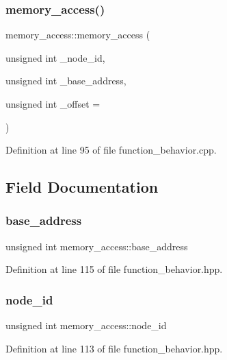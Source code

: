 \subsubsection{\texorpdfstring{memory\+\_\+access()}{memory\_access()}}
{\footnotesize\ttfamily memory\+\_\+access\+::memory\+\_\+access (\begin{DoxyParamCaption}\item[{unsigned int}]{\+\_\+node\+\_\+id,  }\item[{unsigned int}]{\+\_\+base\+\_\+address,  }\item[{unsigned int}]{\+\_\+offset = {} }\end{DoxyParamCaption})}



Definition at line 95 of file function\+\_\+behavior.\+cpp.



\subsection{Field Documentation}
\mbox{\label{structmemory__access_aea0ee31948f3811cfb5e6f8de84000c5}} 
\subsubsection{\texorpdfstring{base\+\_\+address}{base\_address}}
{\footnotesize\ttfamily unsigned int memory\+\_\+access\+::base\+\_\+address}



Definition at line 115 of file function\+\_\+behavior.\+hpp.

\mbox{\label{structmemory__access_a6797d28df5786ff0a56b98dd7c440ab1}} 
\subsubsection{\texorpdfstring{node\+\_\+id}{node\_id}}
{\footnotesize\ttfamily unsigned int memory\+\_\+access\+::node\+\_\+id}



Definition at line 113 of file function\+\_\+behavior.\+hpp.

